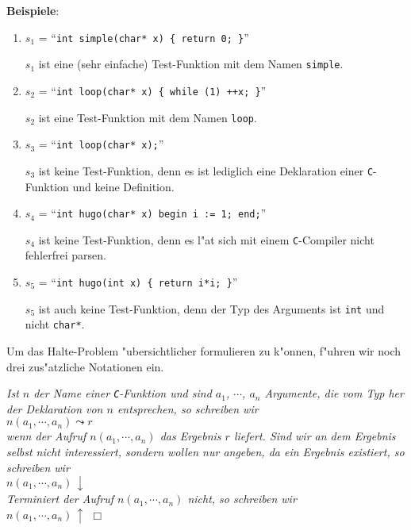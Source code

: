 \noindent
\textbf{Beispiele}:  
\begin{enumerate}
\item $s_1$ = ``{\tt int simple(char* x) \{ return 0; \}}''

      $s_1$ ist eine (sehr einfache) Test-Funktion mit dem Namen \texttt{simple}.
\item $s_2$ = ``{\tt int loop(char* x) \{ while (1) ++x; \}}''

      $s_2$ ist eine Test-Funktion mit dem Namen \texttt{loop}. 
\item $s_3$ = ``{\tt int loop(char* x);}''

      $s_3$ ist keine Test-Funktion, denn es ist lediglich eine Deklaration einer
      \texttt{C}-Funktion und keine Definition.
\item $s_4$ = ``{\tt int hugo(char* x) begin i := 1; end;}''

      $s_4$ ist keine Test-Funktion, denn es l"a\3t sich mit einem
      \texttt{C}-Compiler nicht fehlerfrei parsen.
\item $s_5$ = ``{\tt int hugo(int x) \{ return i*i; \}}''

      $s_5$ ist auch keine Test-Funktion, denn der Typ des Arguments ist \texttt{int}
      und nicht \texttt{char*}.
\end{enumerate}
Um das Halte-Problem "ubersichtlicher formulieren zu k"onnen, f"uhren wir noch drei
zus"atzliche Notationen ein.
\begin{Notation}[$\leadsto$, $\downarrow$, $\uparrow$]
{\em
Ist $n$ der Name einer \texttt{C}-Funktion und sind $a_1$, $\cdots$, $a_n$ Argumente, die
vom Typ her der Deklaration von $n$ entsprechen, so schreiben wir \\[0.3cm]
\hspace*{1.3cm} $n(a_1, \cdots, a_n) \leadsto r$ \\[0.3cm]
wenn der Aufruf $n(a_1, \cdots, a_n)$ das Ergebnis $r$ liefert.  Sind wir an dem Ergebnis
selbst nicht interessiert, sondern wollen nur angeben, da\3 ein Ergebnis existiert, so
schreiben wir \\[0.3cm]
\hspace*{1.3cm} $n(a_1, \cdots, a_n) \,\downarrow$ \\[0.3cm]
Terminiert der Aufruf $n(a_1, \cdots, a_n)$ nicht, so schreiben wir \\[0.3cm]
\hspace*{1.3cm} $n(a_1, \cdots, a_n) \,\uparrow$ \hspace*{\fill} $\Box$
}
\end{Notation}

